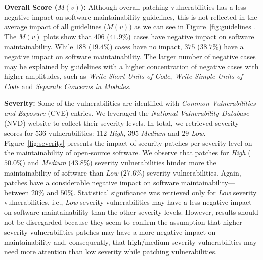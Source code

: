 \documentclass[10pt,conference]{IEEEtran}
\begin{document}
\textbf{Overall Score ($M(v)$):} 
Although overall patching vulnerabilities has a less negative impact
on software maintainability guidelines, this is not reflected in the average 
impact of all guidelines ($M(v)$) as we can see in Figure~\ref{fig:guidelines}.
The $M(v)$ plots show that $406$ ($41.9\%$) cases have negative impact
on software maintainability. While $188$ ($19.4\%$) cases have no impact, $375$ 
($38.7\%$) have a negative impact on software maintainability. The larger number of 
negative cases may be explained by guidelines with a higher concentration of negative 
cases with higher amplitudes, such as \emph{Write Short Units of Code}, \emph{Write 
Simple Units of Code} and \emph{Separate Concerns in Modules}.



\textbf{Severity:} Some of the vulnerabilities are identified with \emph{Common 
Vulnerabilities and Exposure} (CVE) entries. We leveraged the \emph{National 
Vulnerability Database} (NVD) website to collect their severity levels. In total, 
we retrieved severity scores for $536$ vulnerabilities: $112$ \emph{High}, 
$395$ \emph{Medium} and $29$ \emph{Low}. Figure~\ref{fig:severity} 
presents the impact of security patches per severity level on the 
maintainability of open-source software. We observe that patches for 
\emph{High} ($50.0\%$) and \emph{Medium} ($43.8\%$) severity vulnerabilities 
hinder more the maintainability of software than \emph{Low} ($27.6\%$) 
severity vulnerabilities. Again, patches have a considerable 
negative impact on software maintainability---between $20\%$ 
and $50\%$. Statistical significance was retrieved only for \emph{Low}
severity vulnerabilities, i.e., \emph{Low} severity vulnerabilities
may have a less negative impact on software maintainability than the 
other severity levels. However, results should not be disregarded 
because they seem to confirm the 
assumption that higher severity vulnerabilities patches may have a 
more negative impact on maintainability and, consequently, that high/medium 
severity vulnerabilities may need more attention than low severity while 
patching vulnerabilities.
\end{document}
